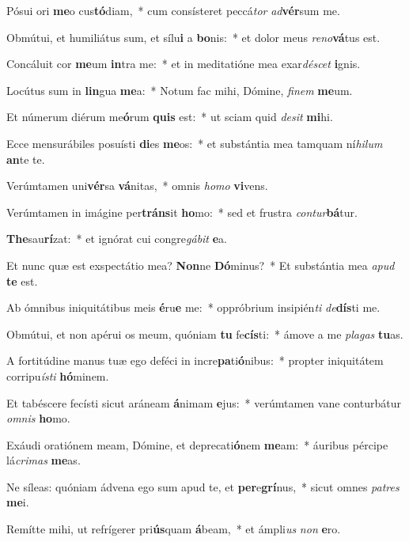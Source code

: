 \item Pósui ori \textbf{me}o cus\textbf{tó}diam,~* cum consísteret peccá\textit{tor} \textit{ad}\textbf{vér}sum me.
\item Obmútui, et humiliátus sum, et sílu\textbf{i} a \textbf{bo}nis:~* et dolor meus \textit{re}\textit{no}\textbf{vá}tus est.
\item Concáluit cor \textbf{me}um \textbf{in}tra me:~* et in meditatióne mea exar\textit{dé}\textit{scet} \textbf{i}gnis.
\item Locútus sum in \textbf{lin}gua \textbf{me}a:~* Notum fac mihi, Dómine, \textit{fi}\textit{nem} \textbf{me}um.
\item Et númerum diérum me\textbf{ó}rum \textbf{quis} est:~* ut sciam quid \textit{de}\textit{sit} \textbf{mi}hi.
\item Ecce mensurábiles posuísti \textbf{di}es \textbf{me}os:~* et substántia mea tamquam ní\textit{hi}\textit{lum} \textbf{an}te te.
\item Verúmtamen uni\textbf{vér}sa \textbf{vá}nitas,~* omnis \textit{ho}\textit{mo} \textbf{vi}vens.
\item Verúmtamen in imágine per\textbf{tráns}it \textbf{ho}mo:~* sed et frustra \textit{con}\textit{tur}\textbf{bá}tur.
\item \textbf{The}sau\textbf{rí}zat:~* et ignórat cui congre\textit{gá}\textit{bit} \textbf{e}a.
\item Et nunc quæ est exspectátio mea? \textbf{Non}ne \textbf{Dó}minus?~* Et substántia mea \textit{a}\textit{pud} \textbf{te} est.
\item Ab ómnibus iniquitátibus meis \textbf{é}ru\textbf{e} me:~* oppróbrium insipién\textit{ti} \textit{de}\textbf{dís}ti me.
\item Obmútui, et non apérui os meum, quóniam \textbf{tu} fe\textbf{cís}ti:~* ámove a me \textit{pla}\textit{gas} \textbf{tu}as.
\item A fortitúdine manus tuæ ego deféci in incre\textbf{pa}ti\textbf{ó}nibus:~* propter iniquitátem corripu\textit{ís}\textit{ti} \textbf{hó}minem.
\item Et tabéscere fecísti sicut aráneam \textbf{á}nimam \textbf{e}jus:~* verúmtamen vane conturbátur \textit{om}\textit{nis} \textbf{ho}mo.
\item Exáudi oratiónem meam, Dómine, et deprecati\textbf{ó}nem \textbf{me}am:~* áuribus pércipe lá\textit{cri}\textit{mas} \textbf{me}as.
\item Ne síleas: quóniam ádvena ego sum apud te, et \textbf{per}e\textbf{grí}nus,~* sicut omnes \textit{pa}\textit{tres} \textbf{me}i.
\item Remítte mihi, ut refrígerer pri\textbf{ús}quam \textbf{á}beam,~* et ámpli\textit{us} \textit{non} \textbf{e}ro.
